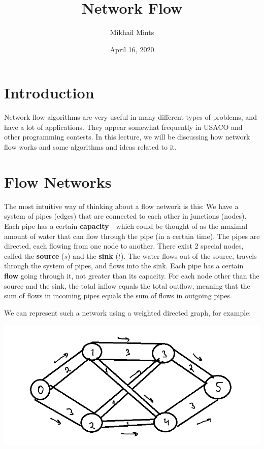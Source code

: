 \documentclass[12pt, letterpaper]{article}
\title{Network Flow}
\author{Mikhail Mints}
\date{April 16, 2020} %
\begin{document}
\maketitle

\section{Introduction}
Network flow algorithms are very useful in many different types of problems, and have a lot of applications. They appear somewhat frequently in USACO and other programming contests. In this lecture, we will be discussing how network flow works and some algorithms and ideas related to it.

\section{Flow Networks}
The most intuitive way of thinking about a flow network is this: We have a system of pipes (edges) that are connected to each other in junctions (nodes). Each pipe has a certain \textbf{capacity} - which could be thought of as the maximal amount of water that can flow through the pipe (in a certain time). The pipes are directed, each flowing from one node to another. There exist 2 special nodes, called the \textbf{source} ($s$) and the \textbf{sink} ($t$). The  water flows out of the source, travels through the system of pipes, and flows into the sink. Each pipe has a certain \textbf{flow} going through it, not greater than its capacity. For each node other than the source and the sink, the total inflow equals the total outflow, meaning that the sum of flows in incoming pipes equals the sum of flows in outgoing pipes.

\newpage
We can represent such a network using a weighted directed graph, for example:

\includegraphics[scale=0.5]{figure1.png}
\end{document}
